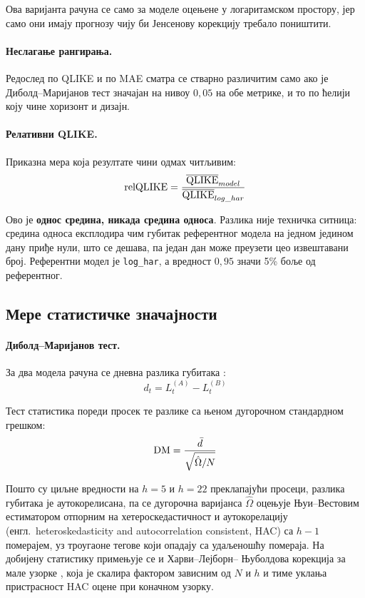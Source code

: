 Ова варијанта рачуна се само за моделе оцењене у логаритамском простору, јер само они
имају прогнозу чију би Јенсенову корекцију требало поништити.

\paragraph{Неслагање рангирања.}
Редослед по QLIKE и по MAE сматра се стварно различитим само ако је
Диболд–Маријанов тест значајан на нивоу $0{,}05$ на обе метрике, и то по ћелији
коју чине хоризонт и дизајн.

\paragraph{Релативни QLIKE.}
Приказна мера која резултате чини одмах читљивим:
\begin{equation}
\text{relQLIKE} = \frac{\overline{\mathrm{QLIKE}}_{model}}{\overline{\mathrm{QLIKE}}_{log\_har}}
\label{eq:relqlike}
\end{equation}

Ово је \textbf{однос средина, никада средина односа}. Разлика није техничка ситница:
средина односа експлодира чим губитак референтног модела на једном једином дану приђе
нули, што се дешава, па један дан може преузети цео извештавани број. Референтни модел
је \texttt{log\_har}, а вредност $0{,}95$ значи 5\% боље од референтног.

\subsection{Мере статистичке значајности}
\label{subsec:nivo2-znacajnost}

\paragraph{Диболд–Маријанов тест.}
За два модела рачуна се дневна разлика губитака \parencite{dieboldMariano1995}:
\begin{equation}
d_t = L_t^{(A)} - L_t^{(B)}
\end{equation}

Тест статистика пореди просек те разлике са њеном дугорочном стандардном грешком:
\begin{equation}
\mathrm{DM} = \frac{\bar{d}}{\sqrt{\hat{\Omega}/N}}
\end{equation}

Пошто су циљне вредности на $h = 5$ и $h = 22$ преклапајући просеци, разлика губитака је
аутокорелисана, па се дугорочна варијанса $\hat{\Omega}$ оцењује Њуи–Вестовим
естиматором отпорним на хетероскедастичност и аутокорелацију (енгл.\ heteroskedasticity
and autocorrelation consistent, HAC) \parencite{neweyWest1987} са $h-1$ померајем, уз троугаоне тегове који
опадају са удаљеношћу помераја. На добијену статистику примењује се и Харви–Лејборн–
Њуболдова корекција за мале узорке \parencite{harvey1997}, која је скалира фактором
зависним од $N$ и $h$ и тиме уклања пристрасност HAC оцене при коначном узорку.

